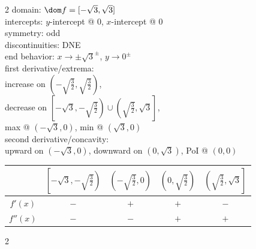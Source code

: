 \documentclass{book}
\begin{document}
\begin{appendices}
\begin{enumerate}[!HW!]
\begin{multicols}{2}
domain: $\dom f = [-\sqrt{3},\sqrt{3}]$ \\
intercepts: $y$-intercept @ 0, $x$-intercept @ 0\\
symmetry: odd \\ 
discontinuities: DNE\\
end behavior: $x\to \pm\sqrt{3}^\pm$, $y\to 0^\pm$\\
first derivative/extrema:\\ increase on $\left(-\sqrt{\frac{3}{2}},\sqrt{\frac{3}{2}}\right)$,\\ decrease on $\left[-\sqrt{3},-\sqrt{\frac{3}{2}}\right)\cup\left(\sqrt{\frac{3}{2}},\sqrt{3}\right]$,\\ max @ $(-\sqrt{3},0)$, min @ $(\sqrt{3},0)$\\
second derivative/concavity:\\ upward on $(-\sqrt{3},0)$, downward on $(0,\sqrt{3})$, PoI @ $(0,0)$\vspace{-15pt}
\begin{center}
\begin{tabular}{c|c|c|c|c}
 & $\left[-\sqrt{3},-\sqrt{\frac{3}{2}}\right)$ & $\left(-\sqrt{\frac{3}{2}}, 0\right)$ & $\left(0,\sqrt{\frac{3}{2}}\right)$ & $\left(\sqrt{\frac{3}{2}}, \sqrt{3}\right]$ \\ \hline
$f'(x)$ & $-$ & $+$ & $+$ & $-$\\ 
$f''(x)$ & $-$ & $-$ & $+$ & $+$ \\ 
\end{tabular}
\end{center}
\end{multicols}
 

\itemspade \mbox{}\vspace{-25pt}

\begin{multicols}{2}
\columnbreak
 

\end{multicols}
\end{enumerate}
\end{appendices}
\end{document}
